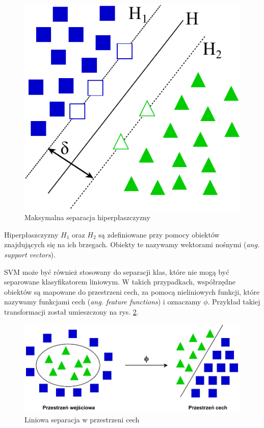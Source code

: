 \begin{figure}[h]
	\centering
	\includegraphics[scale=1.0]{graphics/01_podstawy_teoretyczne/svm-margin.pdf}
	\caption{ Maksymalna separacja hiperpłaszczyzny }
	\label{fig:svm-margin}
\end{figure}

Hiperpłaszczyzny $H_1$ oraz $H_2$ są zdefiniowane przy pomocy obiektów znajdujących się na ich brzegach. Obiekty te nazywamy wektorami nośnymi (\emph{ang. support vectors}).

SVM może być również stosowany do separacji klas, które nie mogą być separowane klasyfikatorem liniowym. W takich przypadkach, współrzędne obiektów są mapowane do przestrzeni cech, za pomocą nieliniowych funkcji, które nazywamy funkcjami cech (\emph{ang. feature functions}) i oznaczamy $\phi$. Przykład takiej transformacji został umieszczony na rys. \ref{fig:svm-phi}.

\begin{figure}[h]
	\centering
	\includegraphics[scale=1.0]{graphics/01_podstawy_teoretyczne/svm-phi.pdf}
	\caption{ Liniowa separacja w przestrzeni cech }
	\label{fig:svm-phi}
\end{figure}

